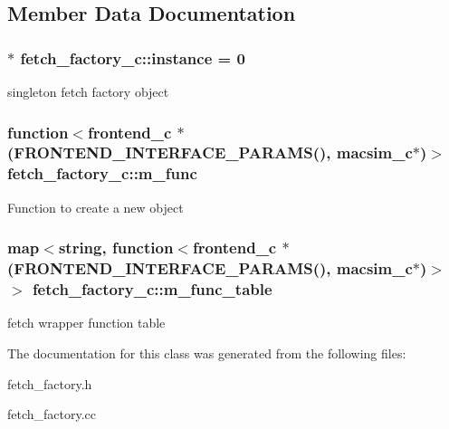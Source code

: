 \subsection{Member Data Documentation}
\hypertarget{classfetch__factory__c_ac55490e2ed68583a97297149abbcec98}{
\subsubsection[{instance}]{ $\ast$ {\bf fetch\_\-factory\_\-c::instance} = 0}}
\label{classfetch__factory__c_ac55490e2ed68583a97297149abbcec98}
singleton fetch factory object \hypertarget{classfetch__factory__c_a737090cb3269200990000a3996308979}{
\subsubsection[{m\_\-func}]{\setlength{\rightskip}{0pt plus 5cm}function$<${\bf frontend\_\-c} $\ast$ (FRONTEND\_\-INTERFACE\_\-PARAMS(), {\bf macsim\_\-c}$\ast$)$>$ {\bf fetch\_\-factory\_\-c::m\_\-func}}}
\label{classfetch__factory__c_a737090cb3269200990000a3996308979}
Function to create a new object \hypertarget{classfetch__factory__c_adcab7760b1a40d022ae89777814880e3}{
\subsubsection[{m\_\-func\_\-table}]{\setlength{\rightskip}{0pt plus 5cm}map$<$string, function$<${\bf frontend\_\-c} $\ast$ (FRONTEND\_\-INTERFACE\_\-PARAMS(), {\bf macsim\_\-c}$\ast$)$>$ $>$ {\bf fetch\_\-factory\_\-c::m\_\-func\_\-table}}}
\label{classfetch__factory__c_adcab7760b1a40d022ae89777814880e3}
fetch wrapper function table 

The documentation for this class was generated from the following files:\begin{DoxyCompactItemize}
\item 
fetch\_\-factory.h\item 
fetch\_\-factory.cc\end{DoxyCompactItemize}
